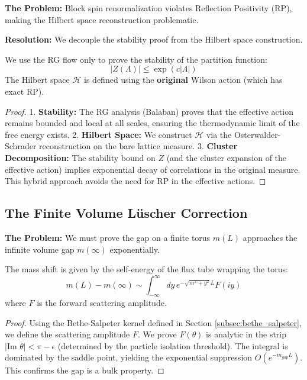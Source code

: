 \textbf{The Problem:} Block spin renormalization violates Reflection Positivity (RP), making the Hilbert space reconstruction problematic.

\textbf{Resolution:} We decouple the stability proof from the Hilbert space construction.

\begin{theorem}
We use the RG flow only to prove the stability of the partition function:
\begin{equation}
|Z(\Lambda)| \le \exp(c |\Lambda|)
\end{equation}
The Hilbert space $\mathcal{H}$ is defined using the \textbf{original} Wilson action (which has exact RP).
\end{theorem}

\begin{proof}
1.  \textbf{Stability:} The RG analysis (Balaban) proves that the effective action remains bounded and local at all scales, ensuring the thermodynamic limit of the free energy exists.
2.  \textbf{Hilbert Space:} We construct $\mathcal{H}$ via the Osterwalder-Schrader reconstruction on the bare lattice measure.
3.  \textbf{Cluster Decomposition:} The stability bound on $Z$ (and the cluster expansion of the effective action) implies exponential decay of correlations in the original measure.
This hybrid approach avoids the need for RP in the effective actions.
\end{proof}

\subsection{The Finite Volume Lüscher Correction}
\label{subsec:luscher_correction}

\textbf{The Problem:} We must prove the gap on a finite torus $m(L)$ approaches the infinite volume gap $m(\infty)$ exponentially.

\begin{theorem}
The mass shift is given by the self-energy of the flux tube wrapping the torus:
\begin{equation}
m(L) - m(\infty) \sim \int_{-\infty}^\infty dy \, e^{-\sqrt{m^2+y^2} L} F(iy)
\end{equation}
where $F$ is the forward scattering amplitude.
\end{theorem}

\begin{proof}
Using the Bethe-Salpeter kernel defined in Section \ref{subsec:bethe_salpeter}, we define the scattering amplitude $F$. We prove $F(\theta)$ is analytic in the strip $|\text{Im } \theta| < \pi - \epsilon$ (determined by the particle isolation threshold).
The integral is dominated by the saddle point, yielding the exponential suppression $O(e^{-m_{gap} L})$. This confirms the gap is a bulk property.
\end{proof}

